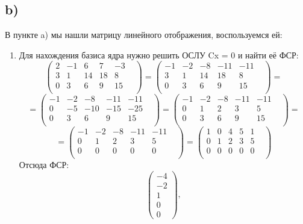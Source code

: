 \documentclass[a4paper,12pt]{article}
\begin{document}
\subsection*{b)}
В пункте a) мы нашли матрицу линейного отображения, воспользуемся ей:
\begin{enumerate}
\item Для нахождения базиса ядра нужно решить ОСЛУ Cx = 0 и найти её ФСР:
\[
\begin{pmatrix}
2 & -1 & 6 & 7 & -3 & \\
3 & 1 & 14 & 18 & 8 & \\
0 & 3 & 6 & 9 & 15 & \\
\end{pmatrix}
=
\begin{pmatrix}
-1 & -2 & -8 & -11 & -11 & \\
3 & 1 & 14 & 18 & 8 & \\
0 & 3 & 6 & 9 & 15 & \\
\end{pmatrix}
=
\]
\[
=
\begin{pmatrix}
-1 & -2 & -8 & -11 & -11 & \\
0 & -5 & -10 & -15 & -25 & \\
0 & 3 & 6 & 9 & 15 & \\
\end{pmatrix}
=
\begin{pmatrix}
-1 & -2 & -8 & -11 & -11 & \\
0 & 1 & 2 & 3 & 5 & \\
0 & 3 & 6 & 9 & 15 & \\
\end{pmatrix}
=
\]
\[
=
\begin{pmatrix}
-1 & -2 & -8 & -11 & -11 & \\
0 & 1 & 2 & 3 & 5 & \\
0 & 0 & 0 & 0 & 0 & \\
\end{pmatrix}
=
\begin{pmatrix}
1 & 0 & 4 & 5 & 1 & \\
0 & 1 & 2 & 3 & 5 & \\
0 & 0 & 0 & 0 & 0 & \\
\end{pmatrix}
\]
Отсюда ФСР:
\[
\begin{pmatrix}
-4 \\ -2 \\ 1 \\ 0 \\ 0
\end{pmatrix}
,
\]
\end{enumerate}
\end{document}

